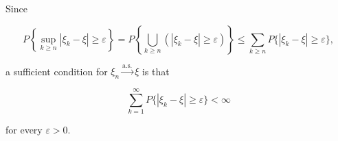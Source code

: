 Since

$$P\left\{\sup_{k \geq n} |\xi_k - \xi| \geq \varepsilon\right\} = P\left\{\bigcup_{k \geq n} (|\xi_k - \xi| \geq \varepsilon)\right\} \leq \sum_{k \geq n} P\{|\xi_k - \xi| \geq \varepsilon\},$$

a sufficient condition for $\xi_n \xrightarrow{\text{a.s.}} \xi$ is that

$$\sum_{k=1}^{\infty} P\{|\xi_k - \xi| \geq \varepsilon\} < \infty$$

for every $\varepsilon > 0$.

